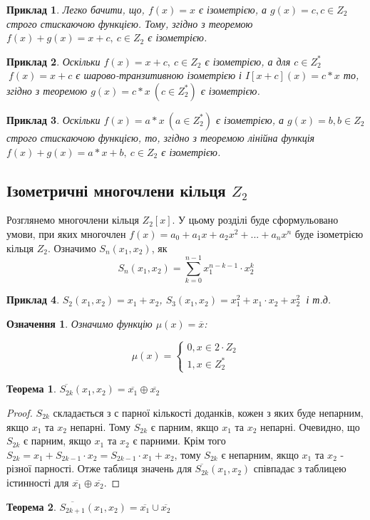 \documentclass[a4paper,12pt]{article} \usepackage{a4wide}
\numberwithin{equation}{subsection}
\newtheorem{theorem}{Теорема}[subsection]
\newtheorem{definition}{Означення}[subsection]
\newtheorem{example}{Приклад}[subsection]
\begin{document}
\begin{example} Легко бачити, що, $f(x)=x$ є ізометрією, а $g(x)=c, c
  \in Z_2$ строго стискаючою функцією. Тому, згідно з теоремою
  $f(x)+g(x)=x+c,\ c \in Z_2$ є ізометрією.
\end{example}

 \begin{example}
   Оскільки $ f(x)=x+c, \ c \in Z_2 $ є ізометрією, а для $c \in
   Z_2^{*} $ $\ f(x)=x+c$ є шарово-транзитивною ізометрією і
   $I[x+c](x)=c*x$ то, згідно з теоремою $g(x)=c*x \ (c \in Z_2^{*})$
   є ізометрією.
 \end{example}

 \begin{example} Оскільки $f(x)=a*x \ (a \in Z_2^*)$ є ізометрією, а
   $g(x)=b, b \in Z_2$ строго стискаючою функцією, то, згідно з
   теоремою лінійна функція $f(x)+g(x)=a*x+b,\ c \in Z_2$ є
   ізометрією.
 \end{example}
 

 \subsection{Ізометричні многочлени кільця $Z_2$}
 Розглянемо многочлени кільця $Z_2[x]$. У цьому розділі буде
 сформульовано умови, при яких многочлен
 $f(x)=a_0+a_1x+a_2x^2+...+a_nx^n$ буде ізометрією кільця $Z_2$.
 Означимо $S_n(x_1,x_2)$, як $$S_n(x_1,x_2)=\sum_{k=0}^{n-1}
 x_1^{n-k-1}\cdot x_2^k $$

 \begin{example} $S_2(x_1,x_2)=x_1+x_2$, $S_3(x_1,x_2)=x_1^2+x_1\cdot
   x_2+x_2^2\ $ і т.д.
 \end{example}
 \begin{definition} Означимо функцію $\mu(x)=\overline{x}$:

$$
\mu(x)=\begin{cases}
  0, x\in 2\cdot Z_2\\

  1,x\in Z_2^*
\end{cases}
$$
\end{definition}



 \begin{theorem}
   $\overline{S_{2k}}(x_1,x_2)=\overline{x_1}\oplus \overline{x_2}$
 \end{theorem}
 \begin{proof}
   $S_{2k}$ складається з с парної кількості доданків, кожен з яких
   буде непарним, якщо $x_1$ та $x_2$ непарні. Тому $S_{2k}$ є парним,
   якщо $x_1$ та $x_2$ непарні. Очевидно, що $S_{2k}$ є парним, якщо
   $x_1$ та $x_2$ є парними. Крім того $S_{2k}=x_1+S_{2k-1}\cdot
   x_2=S_{2k-1}\cdot x_1+x_2$, тому $S_{2k}$ є непарним, якщо $x_1$ та
   $x_2$ - різної парності. Отже таблиця значень для
   $\overline{S_{2k}}(x_1,x_2)$ співпадає з таблицею істинності для
   $\overline{x_1}\oplus \overline{x_2}$.
 \end{proof}
 \begin{theorem}
   $\overline{S_{2k+1}}(x_1,x_2)=\overline{x_1}\cup \overline{x_2}$
 \end{theorem}
\end{document}
